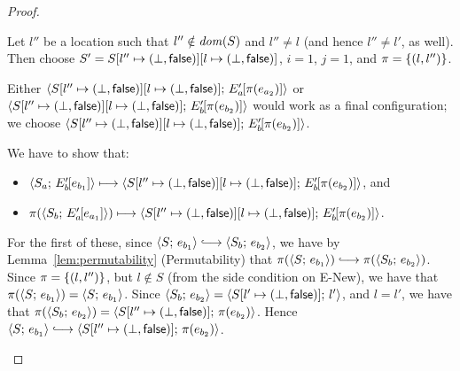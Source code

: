 \begin{proof}
\begin{enumerate}
\begin{enumerate}
\begin{itemize}
          Let $l''$ be a location such that $l'' \notin \mathit{dom}(S)$ and
          $l'' \neq l$ (and hence $l'' \neq l'$, as well).  Then
          choose $S' =
          S[l'' \mapsto (\bot, \textsf{false})][l \mapsto (\bot, \textsf{false})]$,
          $i = 1$, $j = 1$, and $\pi = \left\{(l, l'')\right\}$.

          Either
          $\langle S[l'' \mapsto (\bot, \textsf{false})][l \mapsto (\bot, \textsf{false})];\, E'_a\hspace{-1mm}\left[\pi(e_{a_2})\right] \rangle$
          or
          $\langle S[l'' \mapsto (\bot, \textsf{false})][l \mapsto (\bot, \textsf{false})];\, E'_b\hspace{-1mm}\left[\pi(e_{b_2})\right] \rangle$
          would work as a final configuration; we choose
          $\langle S[l'' \mapsto (\bot, \textsf{false})][l \mapsto (\bot, \textsf{false})];\, E'_b\hspace{-1mm}\left[\pi(e_{b_2})\right] \rangle$.

          We have to show that:
          \begin{itemize}
          \item
            $\langle S_a;\, E'_b\hspace{-1mm}\left[e_{b_1}\right] \rangle \longmapsto
            \langle S[l'' \mapsto (\bot, \textsf{false})][l \mapsto (\bot, \textsf{false})];\, E'_b\hspace{-1mm}\left[\pi(e_{b_2})\right] \rangle$,
            and
          \item
            $\pi(\langle S_b;\, E'_a\hspace{-1mm}\left[e_{a_1}\right] \rangle) \longmapsto
            \langle S[l'' \mapsto (\bot, \textsf{false})][l \mapsto (\bot, \textsf{false})];\, E'_b\hspace{-1mm}\left[\pi(e_{b_2})\right] \rangle$.
          \end{itemize}

          For the first of these, since $\config{S}{e_{b_1}}
          \parstepsto \config{S_b}{e_{b_2}}$, we have by
          Lemma~\ref{lem:permutability} (Permutability) that
          $\pi(\config{S}{e_{b_1}}) \parstepsto
          \pi(\config{S_b}{e_{b_2}})$.  Since $\pi = \left\{(l,
            l'')\right\}$, but $l \notin S$ (from the side condition on {\sc
            E-New}), we have that $\pi(\langle S;\, e_{b_1} \rangle) =
          \langle S;\, e_{b_1} \rangle$. Since $\langle S_b;\, e_{b_2} \rangle =
          \langle S[l' \mapsto (\bot, \textsf{false})];\, l' \rangle$, and $l = l'$, we have
          that $\pi(\langle S_b;\, e_{b_2} \rangle) =
          \langle S[l'' \mapsto (\bot, \textsf{false})];\, \pi(e_{b_2}) \rangle$.  Hence
          $\config{S}{e_{b_1}} \parstepsto
          \config{\extS{S}{l''}{\bot}{\frozenfalse}}{\pi(e_{b_2})}$.


\end{itemize}
\end{enumerate}
\end{enumerate}
\end{proof}
